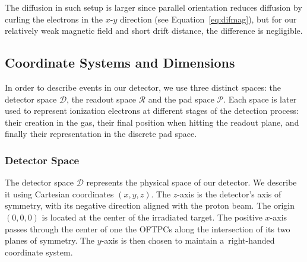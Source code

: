 			The diffusion in such setup is larger since parallel orientation reduces diffusion by curling the electrons in the $x$\nobreakdash-$y$ direction (see Equation~\ref{eq:difmag}), but for our relatively weak magnetic field and short drift distance, the difference is negligible.
	
		\subsection{Coordinate Systems and Dimensions}
		\label{sec:coor}
			In order to describe events in our detector, we use three distinct spaces: the detector space $\mathcal{D}$, the readout space $\mathcal{R}$ and the pad space $\mathcal{P}$. Each space is later used to represent ionization electrons at different stages of the detection process: their creation in the gas, their final position when hitting the readout plane, and finally their representation in the discrete pad space.
		
			\subsubsection{Detector Space}
				The detector space $\mathcal{D}$ represents the physical space of our detector. We describe it using Cartesian coordinates $(x,y,z)$. The $z$-axis is the detector's axis of symmetry, with its negative direction aligned with the proton beam. The origin $(0,0,0)$ is located at the center of the irradiated target. The positive $x$\nobreakdash-axis passes through the center of one the \acp{OFTPC} along the intersection of its two planes of symmetry. The $y$\nobreakdash-axis is then chosen to maintain a~right-handed coordinate system.
				
